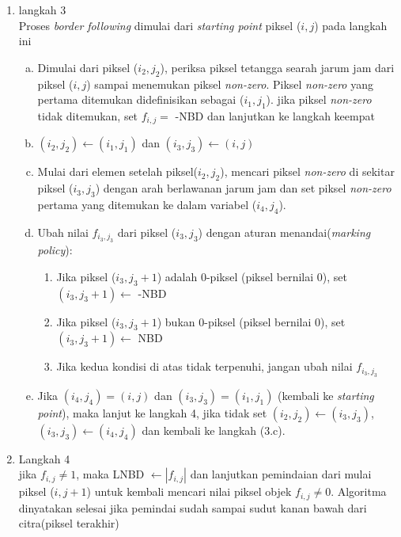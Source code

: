 \begin{enumerate}
\begin{table}[H]
\begin{tabular}[width=6cm]{| c | c | c |}
			\hline
		\end{tabular}
		\label{tabel:aturan_parent}
	\end{table}
	\item langkah 3 \\
	Proses \textit{border following} dimulai dari 
	\textit{starting point} piksel ($i,j$) pada langkah ini
	\begin{enumerate}[(a)]
		\item Dimulai dari piksel ($i_2,j_2$), periksa piksel
		tetangga searah jarum jam dari piksel ($i,j$) sampai
		menemukan piksel \textit{non-zero}. Piksel \textit{non-zero}
		yang pertama ditemukan didefinisikan sebagai 
		($i_1,j_1$). jika piksel \textit{non-zero} tidak 
		ditemukan, set $f_{i,j} =$ -NBD dan lanjutkan ke langkah
		keempat
		\item $(i_2,j_2) \gets (i_1,j_1)$ dan
		$(i_3,j_3) \gets (i,j)$
		\item Mulai dari elemen setelah piksel($i_2,j_2$), mencari
		piksel \textit{non-zero} di sekitar piksel ($i_3,j_3$) 
		dengan arah berlawanan jarum jam dan set piksel 
		\textit{non-zero} pertama yang ditemukan ke dalam
		variabel ($i_4,j_4$).
		\item Ubah nilai $f_{i_3,j_3}$ dari piksel ($i_3,j_3$) 
		dengan aturan menandai(\textit{marking policy}):
		\begin{enumerate}[i]
			\item Jika piksel ($i_3,j_3+1$) 
			adalah 0-piksel (piksel bernilai 0), set
			$(i_3,j_3+1) \gets$ -NBD
			\item Jika piksel ($i_3,j_3+1$)  
			bukan 0-piksel (piksel bernilai 0), set
			$(i_3,j_3+1) \gets$ NBD
			\item Jika kedua kondisi di atas tidak terpenuhi,
			jangan ubah nilai $f_{i_3,j_3}$
		\end{enumerate}
		\item Jika $(i_4,j_4) = (i,j)$ dan $(i_3,j_3) = (i_1,j_1)$
		(kembali ke \textit{starting point}), maka lanjut ke 
		langkah 4, jika tidak set $(i_2,j_2) \gets (i_3,j_3)$, 
		$(i_3,j_3) \gets (i_4,j_4)$ dan kembali ke langkah (3.c).
	\end{enumerate}
	\item Langkah 4 \\
	jika $f_{i,j} \neq 1$, maka LNBD $\gets |f_{i,j}|$ dan
	lanjutkan pemindaian dari mulai piksel ($i,j+1$) 
	untuk kembali mencari nilai piksel objek $f_{i,j} \neq 0$.
	Algoritma dinyatakan selesai jika pemindai sudah sampai
	sudut kanan bawah dari citra(piksel terakhir)
\end{enumerate}
